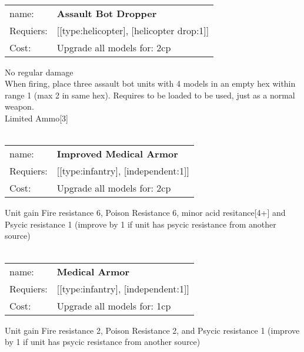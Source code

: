 \ \\
\begin{tabular}{ll}
name: & {\bf Assault Bot Dropper } \\
Requiers: & [[type:helicopter], [helicopter drop:1]] \\
Cost: & Upgrade all models for: 2cp \\
\end{tabular}

No regular damage\\ 
When firing, place three assault bot units with 4 models in an empty hex within range 1 (max 2 in same hex). Requires to be loaded to be used, just as a normal weapon.\\ 
Limited Ammo[3]\\ 









\ \\
\begin{tabular}{ll}
name: & {\bf Improved Medical Armor } \\
Requiers: & [[type:infantry], [independent:1]] \\
Cost: & Upgrade all models for: 2cp \\
\end{tabular}

Unit gain Fire resistance 6, Poison Resistance 6, minor acid resitance[4+] and Psycic resistance 1 (improve by 1 if unit has psycic resistance from another source)\\ 









\ \\
\begin{tabular}{ll}
name: & {\bf Medical Armor } \\
Requiers: & [[type:infantry], [independent:1]] \\
Cost: & Upgrade all models for: 1cp \\
\end{tabular}

Unit gain Fire resistance 2, Poison Resistance 2, and Psycic resistance 1 (improve by 1 if unit has psycic resistance from another source)\\ 









